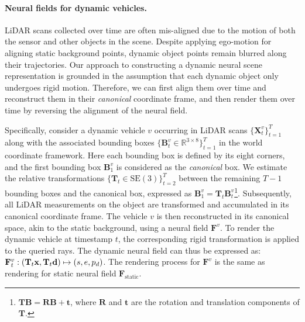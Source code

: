 

\paragraph{Neural fields for dynamic vehicles.} 
LiDAR scans collected over time are often mis-aligned due to the motion of both the sensor and other objects in the scene. Despite applying ego-motion for aligning static background points, dynamic object points remain blurred along their trajectories. Our approach to constructing a dynamic neural scene representation is grounded in the assumption that each dynamic object only undergoes rigid motion. Therefore, we can first align them over time and reconstruct them in their \textit{canonical} coordinate frame, and then render them over time by reversing the alignment of the neural field.

Specifically, consider a dynamic vehicle $v$ 
occurring in LiDAR scans $\{\mathbf{X}^v_t\}_{t=1}^{T}$ along with the associated bounding boxes $\{\mathbf{B}^v_t \in \mathbb{R}^{3\times 8}\}_{t=1}^{T}$ in the world coordinate framework. Here each bounding box is defined by its eight corners, and the first bounding box $\mathbf{B}^v_1$ is considered as the \textit{canonical} box. We estimate the relative transformations $\{\mathbf{T}_t \in \text{SE}(3)\}_{t=2}^{T}$ between the remaining $T-1$ bounding boxes and the canonical box, expressed as $\mathbf{B}_1^v = \mathbf{T}_t \mathbf{B}_t^v$\footnote{$\mathbf{T}\mathbf{B} = \mathbf{R}\mathbf{B} + \mathbf{t}$, where $\mathbf{R}$ and $\mathbf{t}$ are the rotation and translation components of $\mathbf{T}$.}. 
Subsequently, all LiDAR measurements on the object are transformed and accumulated in its canonical coordinate frame. The vehicle $v$ is then reconstructed in its canonical space, akin to the static background, using a neural field $\mathbf{F}^v$. To render the dynamic vehicle at timestamp $t$, the corresponding rigid transformation is applied to the queried rays. The dynamic neural field can thus be expressed as: $\mathbf{F}^v_t: (\mathbf{T}_{t}\mathbf{x}, \mathbf{T}_{t}\mathbf{d}) \mapsto (s, e, p_d)$. The rendering process for $\mathbf{F}^v$ is the same as rendering for static neural field $\mathbf{F}_{\text{static}}$.


